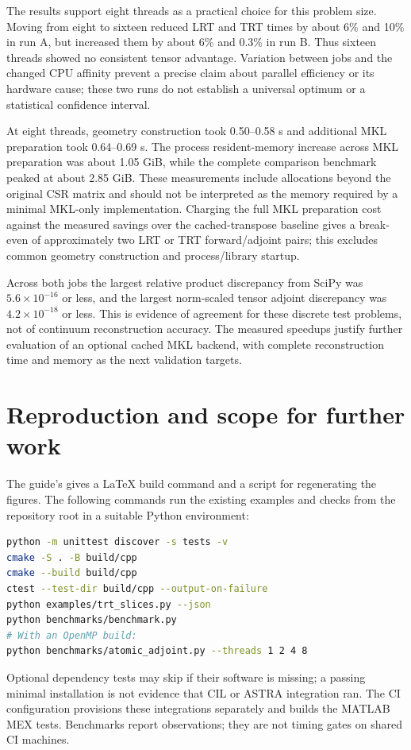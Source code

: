 \documentclass[11pt,a4paper]{article}
\newcommand{\code}[1]{\texttt{\detokenize{#1}}}
\begin{document}
The results support eight threads as a practical choice for this problem
size. Moving from eight to sixteen reduced LRT and TRT times by about
6\% and 10\% in run A, but increased them by about 6\% and 0.3\% in run B.
Thus sixteen threads showed no consistent tensor advantage. Variation
between jobs and the changed CPU affinity prevent a precise claim about
parallel efficiency or its hardware cause; these two runs do not establish
a universal optimum or a statistical confidence interval.

At eight threads, geometry construction took 0.50--0.58 s and additional
MKL preparation took 0.64--0.69 s. The process resident-memory increase
across MKL preparation was about 1.05 GiB, while the complete comparison
benchmark peaked at about 2.85 GiB. These measurements include allocations
beyond the original CSR matrix and should not be interpreted as the memory
required by a minimal MKL-only implementation. Charging the full MKL
preparation cost against the measured savings over the cached-transpose
baseline gives a break-even of approximately two LRT or TRT
forward/adjoint pairs; this excludes common geometry construction and
process/library startup.

Across both jobs the largest relative product discrepancy from SciPy was
$5.6\times10^{-16}$ or less, and the largest norm-scaled tensor adjoint
discrepancy was $4.2\times10^{-18}$ or less. This is evidence of agreement
for these discrete test problems, not of continuum reconstruction accuracy.
The measured speedups justify further evaluation of an optional cached
MKL backend, with complete reconstruction time and memory as the next
validation targets.

\section{Reproduction and scope for further work}
The guide's \code{README.md} gives a LaTeX build command and a script for
regenerating the figures. The following commands run the existing examples
and checks from the repository root in a suitable Python environment:
\par\noindent\begin{minipage}{\linewidth}
\begin{lstlisting}[language=bash]
python -m unittest discover -s tests -v
cmake -S . -B build/cpp
cmake --build build/cpp
ctest --test-dir build/cpp --output-on-failure
python examples/trt_slices.py --json
python benchmarks/benchmark.py
# With an OpenMP build:
python benchmarks/atomic_adjoint.py --threads 1 2 4 8
\end{lstlisting}
\end{minipage}\par
Optional dependency tests may skip if their software is missing; a passing
minimal installation is not evidence that CIL or ASTRA integration ran.
The CI configuration provisions these integrations separately and builds
the MATLAB MEX tests. Benchmarks report observations; they are not timing
gates on shared CI machines.
\end{document}
